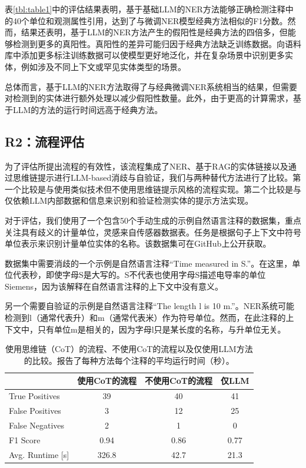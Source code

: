 \documentclass[supercite]{Experimental_Report}
\newcommand{\rtbl}[1]{\autoref{tbl:#1}}
\theoremstyle{definition}
\begin{document}
表\rtbl{table1}中的评估结果表明，基于基础LLM的NER方法能够正确检测注释中的40个单位和观测属性引用，达到了与微调NER模型经典方法相似的F1分数。然而，结果还表明，基于LLM的NER方法产生的假阳性是经典方法的四倍多，但能够检测到更多的真阳性。真阳性的差异可能归因于经典方法缺乏训练数据。向语料库中添加更多标注训练数据可以使模型更好地泛化，并在复杂场景中识别更多实体，例如涉及不同上下文或罕见实体类型的场景。

总体而言，基于LLM的NER方法取得了与经典微调NER系统相当的结果，但需要对检测到的实体进行额外处理以减少假阳性数量。此外，由于更高的计算需求，基于LLM的方法的运行时间远高于经典方法。

\subsection{R2：流程评估}

为了评估所提出流程的有效性，该流程集成了NER、基于RAG的实体链接以及通过思维链提示进行LLM-based消歧与自验证，我们与两种替代方法进行了比较。第一个比较是与使用类似技术但不使用思维链提示风格的流程实现。第二个比较是与仅依赖LLM内部数据和信息来识别和验证检测实体的提示方法实现。

对于评估，我们使用了一个包含50个手动生成的示例自然语言注释的数据集，重点关注具有歧义的计量单位，灵感来自传感器数据表。任务是根据句子上下文中符号单位表示来识别计量单位实体的名称。该数据集可在GitHub\cite{ref12}上公开获取。

数据集中需要消歧的一个示例是自然语言注释``Time measured in S.''。在这里，单位代表秒，即使字母S是大写的。S不代表也使用字母S描述电导率的单位Siemens，因为该解释在自然语言注释的上下文中没有意义。

另一个需要自验证的示例是自然语言注释``The length l is 10 m.''。NER系统可能检测到l（通常代表升）和m（通常代表米）作为符号单位。然而，在此注释的上下文中，只有单位m是相关的，因为字母l只是某长度的名称，与升单位无关。

\begin{table}[htbp]
\centering
\caption{使用思维链（CoT）的流程、不使用CoT的流程以及仅使用LLM方法的比较。报告了每种方法每个注释的平均运行时间（秒）。}
\label{tbl:table2}
\begin{tabular}{lccc}
\toprule
& 使用CoT的流程 & 不使用CoT的流程 & 仅LLM \\
\midrule
True Positives & 39 & 40 & 41 \\
False Positives & 3 & 12 & 25 \\
False Negatives & 2 & 1 & 0 \\
F1 Score & 0.94 & 0.86 & 0.77 \\
Avg. Runtime [s] & 326.8 & 42.7 & 21.3 \\
\bottomrule
\end{tabular}
\end{table}
\end{document}
